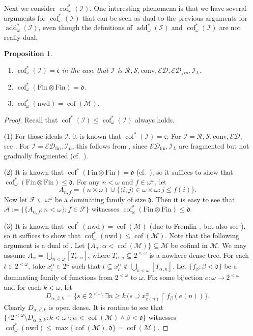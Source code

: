 \documentclass[a4paper,12pt]{amsart}
\newtheorem{prop}[thm]{Proposition}
\theoremstyle{definition}
\numberwithin{thm}{section}
\numberwithin{equation}{section}
\renewcommand{\a}{\alpha}
\newcommand{\cc}{\mathfrak{c}}
\newcommand{\dd}{\mathfrak{d}}
\newcommand{\m}{\mathcal{M}}
\DeclareMathOperator{\add}{add}
\DeclareMathOperator{\cof}{cof}
\newcommand{\cofm}{\cof(\mathcal{M})}
\newcommand{\I}{\mathscr{I}}
\newcommand{\edfin}{\mathcal{ED}_\mathrm{fin}}
\newcommand{\finfin}{\mathrm{Fin}\otimes\mathrm{Fin}}
\newcommand{\nwd}{\mathrm{nwd}}
\newcommand{\conv}{\mathrm{conv}}
\renewcommand{\subset}{\subseteq}
\newcommand{\Meager}{\mathcal{M}}
\begin{document}
    Next we consider $\cof^*_\omega(\I)$. One interesting phenomena is that we have several arguments for $\cof^*_\omega(\I)$ that can be seen as dual to the previous arguments for $\add^*_\omega(\I)$, even though the definitions of $\add^*_\omega(\I)$ and $\cof^*_\omega(\I)$ are not really dual.

    \begin{prop}\leavevmode
        \begin{enumerate}
            \item $\cof^*_\omega(\mathscr{I}) = \cc$ in the case that $\mathscr{I}$ is $\mathcal{R}, \mathcal{S}, \conv, \mathcal{ED}, \mathcal{ED}_{fin}, \I_L$.
            \item $\cof^*_\omega(\finfin) = \dd$.
            \item $\cof^*_\omega(\nwd) = \cof(\mathcal{M})$.
        \end{enumerate}
    \end{prop}
    \begin{proof}
        Recall that $\cof^*(\I)\leq\cof^*_\omega(\I)$ always holds.
        
        (1) For those ideals $\I$, it is known that $\cof^*(\I) = \cc$; For $\I=\mathcal{R}, \mathcal{S}, \conv, \mathcal{ED}$, see \cite[Section 3]{Hru11}. For $\I = \edfin, \I_L$, this follows from \cite[Theorem 2.6]{HRRZ14}, since $ \edfin, \I_L$ are fragmented but not gradually fragmented (cf.\ \cite{BM14}).
            
        (2) It is known that $\cof^*(\finfin) = \dd$ (cf.\ \cite{Hru11}), so it suffices to show that $\cof^*_\omega(\finfin)\leq\dd$. For any $n<\omega$ and $f\in\omega^\omega$, let
        \[
        A_{n, f} = (n\times\omega)\cup\{\langle i, j\rangle\in\omega\times\omega: j\leq f(i)\}.
        \]
        Now let $\mathcal{F}\subset\omega^\omega$ be a dominating family of size $\dd$. Then it is easy to see that $\mathcal{A} := \{\{A_{n, f}: n<\omega\}: f\in\mathcal{F}\}$ witnesses $\cof^*_\omega(\finfin)\leq\dd$.
            
        (3) It is known that $\cof^*(\nwd) = \cof(\Meager)$ (due to Fremlin \cite{Fr91}, but also see \cite[Theorem 1.6(i)]{BHH04}), so it suffices to show that $\cof^*_\omega(\nwd)\leq\cof(\Meager)$. Note that the following argument is a dual of . Let $\{A_\alpha:\a<\cof(\m)\}\subset\m$ be cofinal in $\m$. We may assume $A_\alpha=\bigcup_{n<\omega}[T_{\alpha,n}]$, where $T_{\alpha,n}\subset 2^{<\omega}$ is a nowhere dense tree. 
        For each $t\in 2^{<\omega}$, take $x^\alpha_t \in 2^\omega$ such that $t\subset x^\alpha_t\notin\bigcup_{n<\omega}[T_{\alpha,n}]$. Let $\{f_\beta:\beta<\dd\}$ be a dominating family of functions from $2^{<\omega}$ to $\omega$. Fix some bijection $e\colon\omega\to 2^{<\omega}$ and for each $k<\omega$, let
        \[
        D_{\alpha, \beta, k} = \{s\in 2^{<\omega}: \exists n\geq k\,(s\supseteq x^\alpha_{e(n)}\upharpoonright f_\beta(e(n))\}.
        \]
        Clearly $D_{\alpha, \beta, k}$ is open dense. It is routine to see that $\{\{2^{<\omega}\setminus D_{\alpha,\beta,k}:k<\omega\}:\alpha<\cofm\land\beta<\dd\}$ witnesses $\cof^*_\omega(\nwd)\leq\max\{\cof(\m),\dd\}=\cofm$.
    \end{proof}
\end{document}
